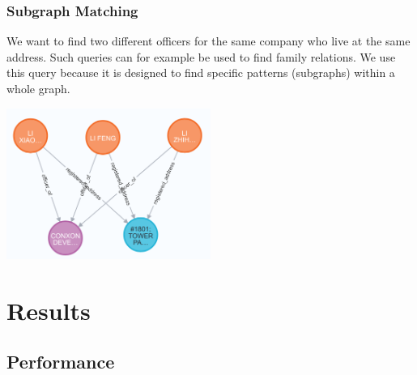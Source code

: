 \documentclass[11pt, a4paper,oneside,chapterprefix=false]{scrbook}
\begin{document}
\subsection{Subgraph Matching}

We want to find two different officers for the same company who live at the same address.
Such queries can for example be used to find family relations.
We use this query because it is designed to find specific patterns (subgraphs) within a whole graph.

\begin{center}
\includegraphics*[width=0.5\textwidth]{figures/query_relation.png}
\end{center}



%
%





\chapter{Results} \label{chp:results}

\section{Performance}
\end{document}
